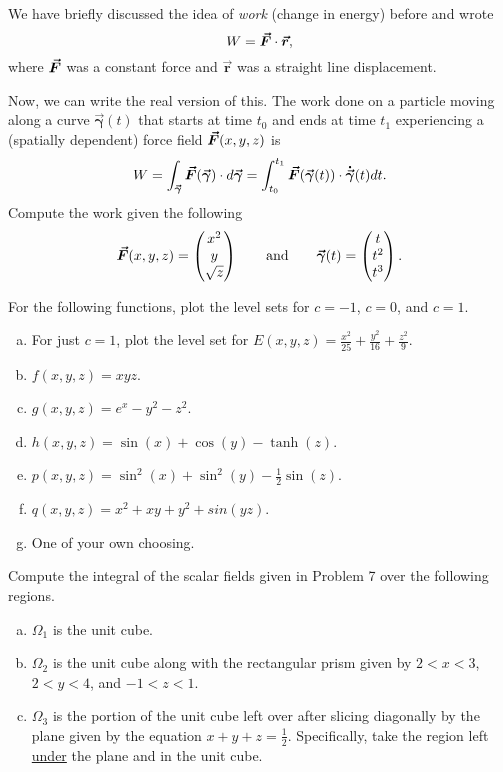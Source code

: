 \documentclass[12pt]{article} %
\newcommand{\curvegamma}{\boldsymbol{\vec{\gamma}}}
\newcommand{\tangentgamma}{\boldsymbol{\dot{\vec{\gamma}}}}
\newcommand{\rvec}{\boldsymbol{\vec{r}}}
\begin{document}
\begin{problem} 
We have briefly discussed the idea of \emph{work} (change in energy) before and wrote
\[
W = \forcevec \cdot \rvec,
\]
where $\boldsymbol{\vec{F}}$ was a constant force and $\rvec$ was a straight line displacement.

Now, we can write the real version of this. The work done on a particle moving along a curve $\curvegamma(t)$ that starts at time $t_0$ and ends at time $t_1$ experiencing a (spatially dependent) force field $\boldsymbol{\vec{F}}(x,y,z)$ is
\[
W = \int_{\curvegamma} \forcevec(\curvegamma) \cdot d\curvegamma = \int_{t_0}^{t_1} \forcevec(\curvegamma(t))\cdot \tangentgamma(t) dt.
\]
Compute the work given the following
\[
\forcevec(x,y,z) = \begin{pmatrix} x^2 \\ y \\ \sqrt{z} \end{pmatrix} \qquad \textrm{and} \qquad \curvegamma(t) = \begin{pmatrix} t \\ t^2 \\ t^3 \end{pmatrix}.
\]
\end{problem}

\begin{problem}
For the following functions, plot the level sets for $c=-1$, $c=0$, and $c=1$. 
\begin{multicols}{2}
\begin{enumerate}[(a)]
    \item For just $c=1$, plot the level set for $E(x,y,z) = \frac{x^2}{25} + \frac{y^2}{16} + \frac{z^2}{9}$.
    \item $f(x,y,z) = xyz$.
    \item $g(x,y,z) = e^x-y^2-z^2$.
    \item $h(x,y,z) = \sin(x)+\cos(y)-\tanh(z)$.
    \item $p(x,y,z) = \sin^2(x)+\sin^2(y)-\frac{1}{2}\sin(z)$.
    \item $q(x,y,z) = x^2+xy+y^2+sin(yz)$.
    \item One of your own choosing.
\end{enumerate}
\end{multicols}
\end{problem}


\begin{problem}
    Compute the integral of the scalar fields given in Problem 7 over the following regions.
  \begin{multicols}{2}
  \begin{enumerate}[(a)]
      \item $\Omega_1$ is the unit cube.
      \item $\Omega_2$ is the unit cube along with the rectangular prism given by $2<x<3$, $2<y<4$, and $-1<z<1$.
      \item $\Omega_3$ is the portion of the unit cube left over after slicing diagonally by the plane given by the equation $x+y+z=\frac{1}{2}$. Specifically, take the region left \underline{under} the plane and in the unit cube.
  \end{enumerate}
  \end{multicols}  
\end{problem}
\end{document}
